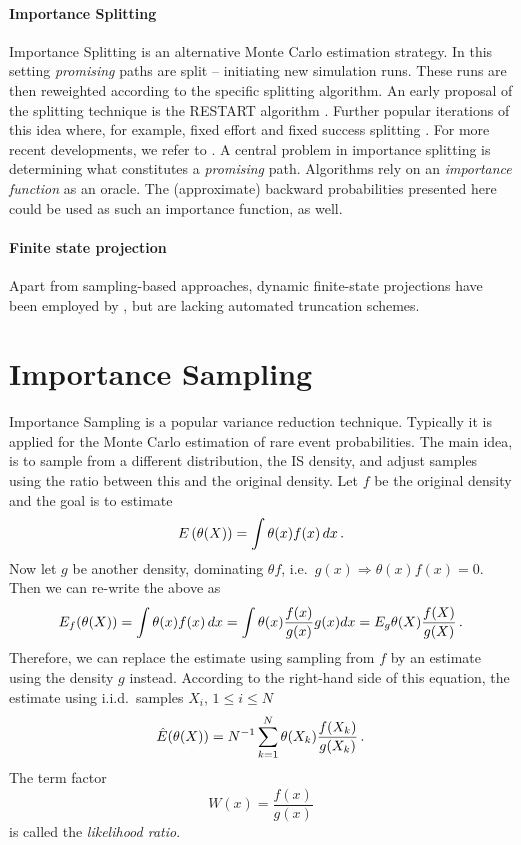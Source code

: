 \paragraph{Importance Splitting}
Importance Splitting is an alternative Monte Carlo estimation strategy.
In this setting \emph{promising} paths are split -- initiating new simulation runs.
These runs are then reweighted according to the specific splitting algorithm.
An early proposal of the splitting technique is the \ac{RESTART} algorithm \parencite{villen1994restart}.
Further popular iterations of this idea where, for example, fixed effort and fixed success splitting \parencite{garvels1998comparison}.
For more recent developments, we refer to \parencite{budde2017better,jegourel2013importance}.
A central problem in importance splitting is determining what constitutes a \emph{promising} path.
Algorithms rely on an \emph{importance function} as an oracle.
The (approximate) backward probabilities presented here could be used as such an importance function, as well.

\paragraph{Finite state projection}
Apart from sampling-based approaches, dynamic finite-state projections have been employed by \citet{mikeev2013numerical}, but are lacking automated truncation schemes.

\section{Importance Sampling}
Importance Sampling is  a popular variance reduction technique.
Typically it is applied for the Monte Carlo estimation of rare event probabilities.
The main idea, is to sample from a different distribution, the \ac{IS} density, and adjust samples using the ratio between this and the original density.
Let $f$ be the original density and the goal is to estimate
\[
    {E}\left(\theta(X)\right) = \int \theta(x)f(x)\,dx\,.
\]
Now let $g$ be another density, dominating $\theta f$, i.e.\ $g(x)\Rightarrow \theta(x)f(x) = 0$. Then we can re-write the above as
\[
    {E}_f({\theta(X)}) = \int \theta(x)f(x)\,dx = \int \theta(x) \frac{f(x)}{g(x)} g(x) dx = {E}_g \theta(X) \frac{f(X)}{g(X)}\,.
\]
Therefore, we can replace the estimate using sampling from $f$ by an estimate using the density $g$ instead.
According to the right-hand side of this equation, the estimate using i.i.d.\ samples $X_i$, $1\leq i \leq N$
\begin{equation}\label{eq:imp_sampl}
    \hat{{E}}(\theta(X)) = N^{-1} \sum_{k=1}^N \theta(X_k) \frac{f(X_k)}{g(X_k)}\,.
\end{equation}
The term factor
\[
    W(x) = \frac{f(x)}{g(x)}
\]
is called the \emph{likelihood ratio}.

